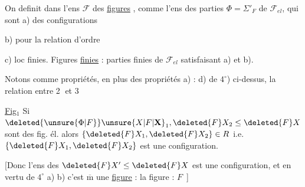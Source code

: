
On definit dans l'ens $\mathcal{F}$ des \uline{figures} , comme l'ens des parties $\Phi={\Sigma}'_{F}$ de $\mathcal{F}_{el}$, qui sont a) des configurations

b)  pour la relation d'ordre

c) loc finies. Figures \uline{finies} : parties finies de $\mathcal{F}_{el}$ satisfaisant a) et b).


Notons comme propriétés, en plus des propriétés a) : d) de $4^\circ$) ci-dessus, la relation entre \textcircled{2} et \textcircled{3}


\uline{Fig}$_1$ Si $\deleted{\unsure{\Phi|F}}\unsure{X|F|\mathbf{X}}_1,\deleted{F}X_2\leq\deleted{F}X$ sont des fig. él. alors $\{\deleted{F}X_1,\deleted{F}X_2\}\in R$ i.e. $\{\deleted{F}X_1,\deleted{F}X_2\}$ est une configuration.

[Donc l'ens des $\deleted{F}X'\leq\deleted{F}X$ est une configuration, et en vertu de $4^\circ$ a) b) c'est $\overline{\mathrm{m}}$ une \uline{figure} : la figure  : $F$\unsure{\ldots|\,--}\ ]

